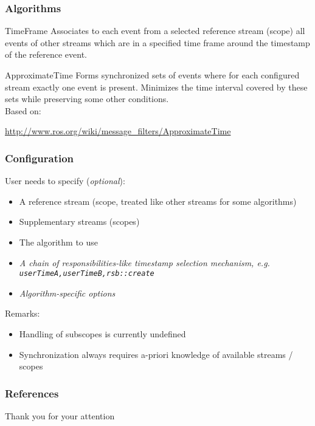 \documentclass{beamer}
\begin{document}
\begin{frame}
    \frametitle{Algorithms}
    \begin{block}{TimeFrame}
        Associates to each event from a selected reference stream (scope) all events of other streams which are in a specified time frame around the timestamp of the reference event.
    \end{block}
    \begin{block}{ApproximateTime}
        Forms synchronized sets of events where for each configured stream exactly one event is present. Minimizes the time interval covered by these sets while preserving some other conditions.\\
        Based on:\\
        \begin{small}
            \url{http://www.ros.org/wiki/message\_filters/ApproximateTime}                                                                               
        \end{small}
    \end{block}
\end{frame}

\begin{frame}
    \frametitle{Configuration}
    User needs to specify (\textit{optional}):
    \begin{itemize}
        \item A reference stream (scope, treated like other streams for some algorithms)
        \item Supplementary streams (scopes)
        \item The algorithm to use
        \item \textit{A chain of responsibilities-like timestamp selection mechanism, e.g. \texttt{userTimeA,userTimeB,rsb::create}}
        \item \textit{Algorithm-specific options}
    \end{itemize}
    Remarks:
    \begin{itemize}
        \item Handling of subscopes is currently undefined
        \item Synchronization always requires a-priori knowledge of available streams / scopes
    \end{itemize}
\end{frame}
    
\begin{frame}
	\frametitle{References}
	\begin{center}
		Thank you for your attention
	\end{center}
\end{frame}
\end{document}
